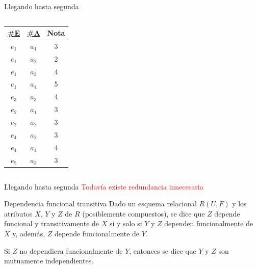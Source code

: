 \begin{frame}{Llegando hasta segunda}
\begin{columns}[T]
\begin{column}{0.3\linewidth}
\begin{center}
                \begin{tabular}{ccc}
                    \underline{\#E} & \underline{\#A} & Nota\\[1mm]
                    \hline
                    $e_1$ & $a_1$ & 3\\
                    $e_1$ & $a_2$ & 2\\
                    $e_1$ & $a_3$ & 4\\
                    $e_1$ & $a_4$ & 5\\
                    $e_3$ & $a_3$ & 4\\
                    $e_2$ & $a_1$ & 3\\
                    $e_2$ & $a_2$ & 3\\
                    $e_4$ & $a_2$ & 3\\
                    $e_4$ & $a_4$ & 4\\
                    $e_5$ & $a_3$ & 3\\
                \end{tabular}
            \end{center}
        \end{column}
    \end{columns}
\end{frame}

\begin{frame}{Llegando hasta segunda}
    \centering
    \Large \textcolor{red}{Todav\'ia existe redundancia innecesaria}
\end{frame}

\begin{frame}{Dependencia funcional transitiva}
    Dado un esquema relacional $R(U,F)$ y los atributos $X$, $Y$ y $Z$ de
    $R$ (posiblemente compuestos), se dice que $Z$ depende funcional
    y transitivamente de $X$ si y solo si $Y$ y $Z$ dependen funcionalmente
    de $X$ y, adem\'as, $Z$ depende funcionalmente de $Y$.

    Si $Z$ no dependiera funcionalmente de $Y$, entonces se dice que $Y$ y $Z$
    son mutuamente independientes.

    
\end{frame}

